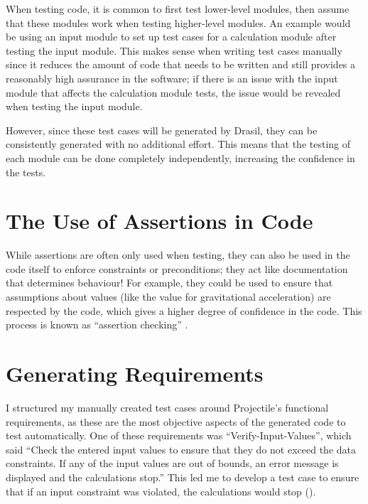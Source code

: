 When testing code, it is common to first test lower-level modules, then assume
that these modules work when testing higher-level modules. An example would be
using an input module to set up test cases for a calculation module after
testing the input module. This makes sense when writing test cases manually
since it reduces the amount of code that needs to be written and still provides
a reasonably high assurance in the software; if there is an issue with the
input module that affects the calculation module tests, the issue would be
revealed when testing the input module.

However, since these test cases will be generated by Drasil, they can be
consistently generated with no additional effort. This means that the testing
of each module can be done completely independently, increasing the confidence
in the tests.

\section{The Use of Assertions in Code}
\label{chap:dev-proc:code-assertions}

While assertions are often only used when testing, they can also be used in
the code itself to enforce constraints or preconditions; they act like
documentation that determines behaviour! For example, they could be used to
ensure that assumptions about values (like the value for gravitational
acceleration) are respected by the code, which gives a higher degree of
confidence in the code. This process is known as ``assertion checking''
\citep{LahiriEtAl2013} .

\section{Generating Requirements}
\label{chap:dev-proc:gen-reqs}

I structured my manually created test cases around Projectile's functional
requirements, as these are the most objective aspects of the generated code to
test automatically. One of these requirements was ``Verify-Input-Values'',
which said ``Check the entered input values to ensure that they do not exceed
the data constraints. If any of the input values are out of bounds, an error
message is displayed and the calculations stop.'' This led me to develop a test
case to ensure that if an input constraint was violated, the
calculations would stop ().

